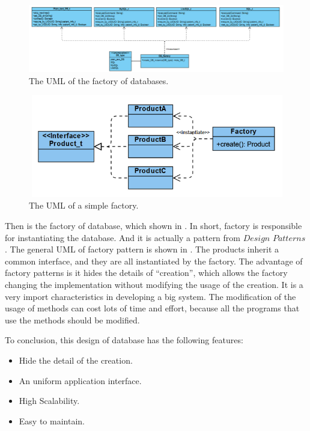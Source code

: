 \documentclass{article}
\begin{document}
  \begin{figure}[h]
    \centering
    \includegraphics[scale = 0.7]{asset/database/factory_UML.png}
    \caption{The UML of the factory of databases.}
    \label{fig:factory_UML}
  \end{figure}

  \begin{figure}[h]
    \centering
    \includegraphics[scale = 0.5]{asset/database/simple_factory.png}
    \caption{The UML of a simple factory.}
    \label{fig:simple_factory}
  \end{figure}
  Then is the factory of database, which shown in . 
  In short, factory is responsible for instantiating the database. And it is actually 
  a pattern from $\textit{Design Patterns}$. 
  The general UML of factory pattern is shown in . The 
  products inherit a common interface, and they are all instantiated by the factory. 
  The advantage of factory patterns is it hides the details of ``creation'', which 
  allows the factory changing the implementation without modifying the usage of the 
  creation. It is a very import characteristics in developing a big system. The 
  modification of the usage of methods can cost lots of time and effort, because 
  all the programs that use the methods should be modified. 
  
  To conclusion, this design of database has the following features:
  \begin{itemize}
    \item Hide the detail of the creation. 
    \item An uniform application interface. 
    \item High Scalability. 
    \item Easy to maintain. 
  \end{itemize}
\end{document}
